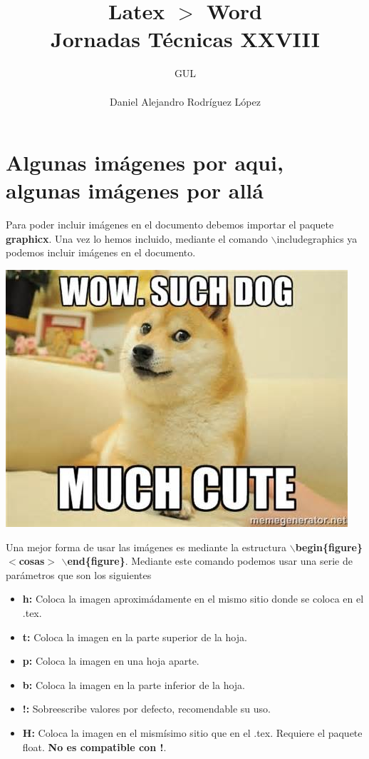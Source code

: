 \documentclass[10pt,a4paper,titlepage]{article} %
\title{ \textbf{ \Huge{Latex $>$ Word}} \\ Jornadas Técnicas XXVIII}
\author{
		\begin{tabular}{l}
			\multicolumn{1}{l}{GUL} \\ \hline \\
			Daniel Alejandro Rodríguez López \\
		\end{tabular}
}
\begin{document}
\maketitle
\newpage

\section*{Algunas imágenes por aqui, algunas imágenes por allá}
	Para poder incluir imágenes en el documento debemos importar el paquete \textbf{graphicx}. Una vez lo hemos incluido, mediante el comando $\backslash$includegraphics ya podemos incluir imágenes en el documento.

	\begin{center}
		\includegraphics[scale=0.5]{images/imagen1}
	\end{center}

	Una mejor forma de usar las imágenes es mediante la estructura \textbf{$\backslash$begin\{figure\} $<$cosas$>$ $\backslash$end\{figure\}}. Mediante este comando podemos usar una serie de parámetros que son los siguientes
	\begin{itemize}
		\item \textbf{h:} Coloca la imagen aproximádamente en el mismo sitio donde se coloca en el .tex.
		\item \textbf{t:} Coloca la imagen en la parte superior de la hoja.
		\item \textbf{p:} Coloca la imagen en una hoja aparte.
		\item \textbf{b:} Coloca la imagen en la parte inferior de la hoja.
		\item \textbf{!:} Sobreescribe valores por defecto, recomendable su uso.
		\item \textbf{H:} Coloca la imagen en el mismísimo sitio que en el .tex. Requiere el paquete float. \textbf{No es compatible con !}.
	\end{itemize}
\end{document}
